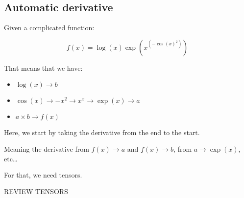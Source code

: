 \documentclass{article}
\begin{document}
\subsection{Automatic derivative}

Given a complicated function:

$$
f(x) = \log(x) \exp \left(x^{\left( -\cos(x)^2 \right)} \right)
$$

That means that we have:

\begin{itemize}
    \item $\log(x) \to b$
    \item $\cos(x) \to -x^2 \to x^x \to \exp(x) \to a$
    \item $a \times b \to f(x)$
\end{itemize}

Here, we start by taking the derivative from the end to the start.

Meaning the derivative from $f(x) \to a$ and $f(x) \to b$, from $a \to \exp(x)$, etc\dots

For that, we need tensors.

REVIEW TENSORS
\end{document}
